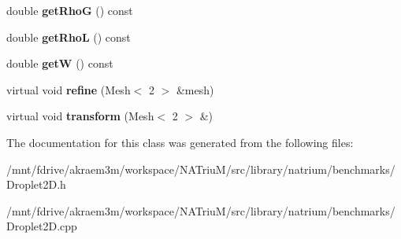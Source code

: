 \begin{DoxyCompactItemize}
\item 
\hypertarget{classnatrium_1_1Droplet2D_a38108f253c1163e597741a805b31e7b7}{
double {\bfseries getRhoG} () const }
\label{classnatrium_1_1Droplet2D_a38108f253c1163e597741a805b31e7b7}

\item 
\hypertarget{classnatrium_1_1Droplet2D_a7f9dfc43e87cf272b9dc3d38392a4c85}{
double {\bfseries getRhoL} () const }
\label{classnatrium_1_1Droplet2D_a7f9dfc43e87cf272b9dc3d38392a4c85}

\item 
\hypertarget{classnatrium_1_1Droplet2D_a054fd09e2aafc7580f45c77e7b70e374}{
double {\bfseries getW} () const }
\label{classnatrium_1_1Droplet2D_a054fd09e2aafc7580f45c77e7b70e374}

\item 
\hypertarget{classnatrium_1_1Droplet2D_a318a82c0ce91f37095db11e87b73419c}{
virtual void {\bfseries refine} (Mesh$<$ 2 $>$ \&mesh)}
\label{classnatrium_1_1Droplet2D_a318a82c0ce91f37095db11e87b73419c}

\item 
\hypertarget{classnatrium_1_1Droplet2D_ae37e598c7ccd5ae4b5b23fe02fc14857}{
virtual void {\bfseries transform} (Mesh$<$ 2 $>$ \&)}
\label{classnatrium_1_1Droplet2D_ae37e598c7ccd5ae4b5b23fe02fc14857}

\end{DoxyCompactItemize}


The documentation for this class was generated from the following files:\begin{DoxyCompactItemize}
\item 
/mnt/fdrive/akraem3m/workspace/NATriuM/src/library/natrium/benchmarks/Droplet2D.h\item 
/mnt/fdrive/akraem3m/workspace/NATriuM/src/library/natrium/benchmarks/Droplet2D.cpp\end{DoxyCompactItemize}
